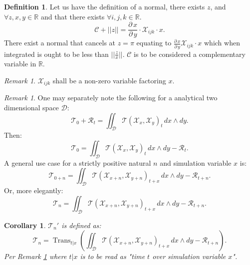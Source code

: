 \documentclass[10pt]{article}
\theoremstyle{plain}
\newtheorem{corollary}[theorem]{Corollary}
\theoremstyle{definition}
\newtheorem{definition}[theorem]{Definition}
\theoremstyle{remark}
\newtheorem{remark}[theorem]{Remark}
\begin{document}
\begin{definition}
	Let us have the definition of a normal, there exists $z$, and $\forall z, x, y \in \mathbb{R}$ and that there exists $\forall i, j, k \in \mathbb{R}$.
	\begin{equation}
		\mathcal{C} + ||z|| = \frac{\partial \, x}{\partial \, y} \cdot \mathcal{X}_{ijk} \cdot x.
	\end{equation}
	There exist a normal that cancels at $z=\pi$ equating to $\frac{\partial \, x}{\partial \, y} \mathcal{X}_{ijk} \cdot x$ which when integrated is ought to be less than $||\frac{z}{x}||$. $\mathcal{C}$ is to be considered a complementary variable in $\mathbb{R}$.
\end{definition}

\begin{remark}
	$\mathcal{X}_{ijk}$ shall be a non-zero variable factoring $x$.
\end{remark}

\begin{remark}
\label{rem:math-special-case}
	One may separately note the following for a analytical two dimensional space $\mathcal{D}$:
	\begin{equation}
		\mathcal{T}_0 + \mathcal{R}_{t} = \iint_{\mathcal{D}} \mathcal{T}(\mathcal{X}_{x}, \mathcal{X}_{y})_{t} \, dx \land dy.
	\end{equation}
	Then:
	\begin{equation}
		\mathcal{T}_0 = \iint_{\mathcal{D}} \mathcal{T}(\mathcal{X}_{x}, \mathcal{X}_{y})_{t} \, dx \land dy - \mathcal{R}_{t}.
	\end{equation}
	A general use case for a strictly positive natural $n$ and simulation variable $x$ is:
	\begin{equation}
		\mathcal{T}_{0+n} = \iint_{\mathcal{D}} \mathcal{T}(\mathcal{X}_{x+n}, \mathcal{X}_{y+n})_{t+x} \, dx \land dy - \mathcal{R}_{t+n}.
	\end{equation}
	Or, more elegantly:
	\begin{equation}
		\mathcal{T}_{n} = \iint_{\mathcal{D}} \mathcal{T}(\mathcal{X}_{x+n}, \mathcal{X}_{y+n})_{t+x} \, dx \land dy - \mathcal{R}_{t+n}.
	\end{equation}
\end{remark}

\begin{corollary}
	$\mathcal{T}_{n}'$ is defined as:
	\begin{equation}
		\mathcal{T}_{n} =\operatorname{Trans}_{t|x}(\iint_{\mathcal{D}} \mathcal{T}(\mathcal{X}_{x+n}, \mathcal{X}_{y+n})_{t+x} \, dx \land dy - \mathcal{R}_{t+n}).
	\end{equation}
	Per Remark \ref{rem:math-special-case} where $t|x$ is to be read as "time $t$ over simulation variable $x$".
\end{corollary}

\nocite{*}



\end{document}
